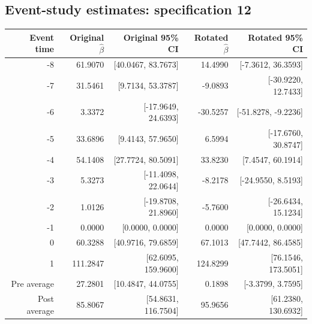 \documentclass[10pt]{article}
\begin{document}
\subsection*{Event-study estimates: specification 12}
\begin{center}\scriptsize
\begin{tabular}{r rr rr}
\toprule
Event time & Original $\hat\beta$ & Original 95\% CI & Rotated $\hat\beta$ & Rotated 95\% CI \\
\midrule
-8 & 61.9070 & [40.0467, 83.7673] & 14.4990 & [-7.3612, 36.3593] \\
-7 & 31.5461 & [9.7134, 53.3787] & -9.0893 & [-30.9220, 12.7433] \\
-6 & 3.3372 & [-17.9649, 24.6393] & -30.5257 & [-51.8278, -9.2236] \\
-5 & 33.6896 & [9.4143, 57.9650] & 6.5994 & [-17.6760, 30.8747] \\
-4 & 54.1408 & [27.7724, 80.5091] & 33.8230 & [7.4547, 60.1914] \\
-3 & 5.3273 & [-11.4098, 22.0644] & -8.2178 & [-24.9550, 8.5193] \\
-2 & 1.0126 & [-19.8708, 21.8960] & -5.7600 & [-26.6434, 15.1234] \\
-1 & 0.0000 & [0.0000, 0.0000] & 0.0000 & [0.0000, 0.0000] \\
0 & 60.3288 & [40.9716, 79.6859] & 67.1013 & [47.7442, 86.4585] \\
1 & 111.2847 & [62.6095, 159.9600] & 124.8299 & [76.1546, 173.5051] \\
\midrule
Pre average & 27.2801 & [10.4847, 44.0755] & 0.1898 & [-3.3799, 3.7595] \\
Post average & 85.8067 & [54.8631, 116.7504] & 95.9656 & [61.2380, 130.6932] \\
\bottomrule
\end{tabular}
\end{center}
\clearpage
\end{document}
